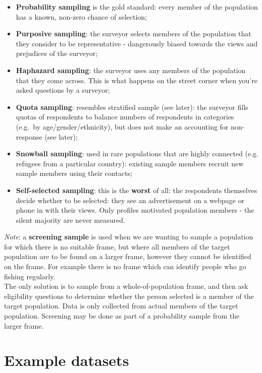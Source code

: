 \documentclass[
]{book}
\providecommand{\tightlist}{%
  \setlength{\itemsep}{0pt}\setlength{\parskip}{0pt}}
\begin{document}
\begin{itemize}
\tightlist
\item
  \textbf{Probability sampling} is the gold standard: every member of the population
  has a known, non-zero chance of selection;
\item
  \textbf{Purposive sampling}: the surveyor selects members of the population that
  they consider to be representative - dangerously biased towards the views
  and prejudices of the surveyor;
\item
  \textbf{Haphazard sampling}: the surveyor uses any members of the population that
  they come across. This is what happens on the street corner when you're asked
  questions by a surveyor;
\item
  \textbf{Quota sampling}: resembles stratified sample (see later): the surveyor fills
  quotas of respondents to balance numbers of respondents in categories (e.g.~by
  age/gender/ethnicity), but does not make an accounting for non-response (see later);
\item
  \textbf{Snowball sampling}: used in rare populations that are highly connected (e.g.
  refugees from a particular country): existing sample members recruit new sample
  members using their contacts;
\item
  \textbf{Self-selected sampling}: this is the \textbf{worst} of all: the respondents themselves
  decide whether to be selected: they see an advertisement on a webpage or phone
  in with their views. Only profiles motivated population members - the silent
  majority are never measured.
\end{itemize}

\emph{Note}: a \textbf{screening sample} is used when we are wanting to sample a population
for which there is no suitable frame, but where all members of the target population
are to be found on a larger frame, however they cannot be identified on the frame.
For example there is no frame which can identify people who go fishing regularly.\\
The only solution is to sample from a whole-of-population frame, and then ask eligibility
questions to determine whether the person selected is a member of the target population.
Data is only collected from actual members of the target population. Screening may be
done as part of a probability sample from the larger frame.

\section{Example datasets}\label{example-datasets}
\end{document}

